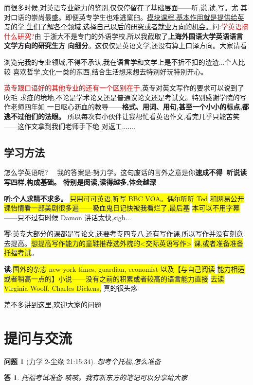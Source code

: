 \documentclass[utf8,a4paper]{ctexart}
\theoremstyle{nonumberplain}
\newtheorem{answer}{\color{blue}答}
\theoremstyle{nonumberplain}
\newtheorem{question}{\color{magenta}问题}
\newcommand\tips[1]{\colorbox{yellow}{#1}}
\begin{document}
而很多时候,对英语专业能力的鉴别,仅仅停留在了基础层面——听,说,读,写。尤
其对口语的崇尚最盛。即便英专学生也难逃窠臼。\uline{模块课程,基本作用就是提供给英专的学 生们了解各个领域,选择自己以后的研究或者就业方向的机会。}问:\textcolor{red}{学英语搞什么研究?}由 于浙大不是专门的外语学校,所以我截取了\textbf{上海外国语大学英语语言文学方向的研究生方 向细分}。这仅仅是英语文学,还没有算上口译方向。大家请看

浏览完我的专业领域,不得不承认,我在语言学和文学上是不折不扣的渣渣...个人比较 喜欢哲学,文化一类的东西,结合生活想来想去特别好玩特别开心。

\textcolor{red}{英专跟口语好的其他专业的还有一个区别在于},英专对英文写作的要求可以说到了吹毛 求疵的境地,不论是学术论文还是普通议论文还是考试文。特别感谢学院的写作老师四年如 一日呕心沥血的教导——\textbf{格式、用词、用句,甚至一个小小的标点,都逃不过他们的法眼。} 所以每次有小伙伴让我帮忙看英语作文,看完几乎只能苦笑——这作文拿到我们老师手下绝 对返工.......
\subsection{学习方法}
怎么学英语呢?~~ 我的答案是:努力学。这句废话的言外之意是你\textbf{速成不得~听说读写四样,构成基础。
特别是阅读,读得越多,体会越深~ }

\textbf{听:个人求精不求多。}
\tips{只用可可英语,听写 BBC VOA。偶尔听听 Ted}
\tips{和网易公开课怡情看一部美剧很多遍——吸血鬼日记快被我看烂了,最后基}
\tips{本可以不用字幕}——只不过有时候
Damon 讲话太快,sigh...

\textbf{写}:\uline{英专大部分的课都是写论文},还要考专四专八,还有\uline{写作课},所以写作并没有刻意去提高。\tips{想提高写作能力的童鞋推荐选外院的<交际英语写作>}
\tips{课,或者准备准备托福考试}。

\textbf{读}:\tips{国外的杂志 new york times, guardian, economist 以及【与自己阅读}
\tips{能力相适或者稍高一点的】小说——没有之前的积累或者较高的语言能力直接}
\tips{去读 Virginia Woolf, Charles Dickens,}
真的很头疼

差不多讲到这里,欢迎大家的问题~


\section{提问与交流}
\begin{question}[力学 2-尘缘 21:15:34]
  想考个托福,怎么准备
\end{question}
\begin{answer}
  托福考试准备 咳咳。我有新东方的笔记可以分享给大家
\end{answer}
\end{document}
